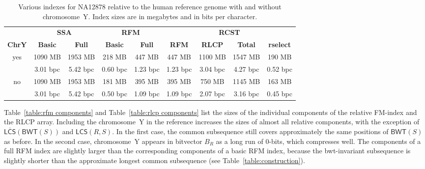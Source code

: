 \documentclass[a4paper,11pt]{llncs}
\renewcommand{\complement}[1]{\ensuremath{\overline{ #1 }}}
\newcommand{\RCST}{\textsf{RCST}}
\newcommand{\SSA}{\textsf{SSA}}
\newcommand{\RFM}{\textsf{RFM}}
\newcommand{\mBWT}{\ensuremath{\mathsf{BWT}}}
\newcommand{\RLCP}{\textsf{RLCP}}
\newcommand{\mLCS}{\ensuremath{\mathsf{LCS}}}
\newcommand{\mCS}{\ensuremath{\complement{\mathsf{LCS}}}}
\newcommand{\rselect}{\textsf{rselect}}
\newcommand{\zerobit}{$0$\nobreakdash-bit}
\begin{document}
\begin{table}
\caption{Various indexes for NA12878 relative to the human reference genome with and without chromosome~Y. Index sizes are in megabytes and in bits per character.}\label{table:indexes}
\setlength{\extrarowheight}{2pt}
\setlength{\tabcolsep}{3pt}
\begin{center}
\begin{tabular}{c|cc|cc|cccc}
\hline
 &
\multicolumn{2}{c|}{\textbf{\SSA}} &
\multicolumn{2}{c|}{\textbf{\RFM}} &
\multicolumn{4}{c}{\textbf{\RCST}} \\
\textbf{ChrY} &
\textbf{Basic} & \textbf{Full} &
\textbf{Basic} & \textbf{Full} &
\textbf{\RFM} & \textbf{\RLCP} & \textbf{Total} & \textbf{\rselect} \\
\hline
\multirow{2}{*}{yes} &  1090 MB &  1953 MB &   218 MB &   447 MB &   447 MB &  1100 MB &  1547 MB &   190 MB \\
                     & 3.01 bpc & 5.42 bpc & 0.60 bpc & 1.23 bpc & 1.23 bpc & 3.04 bpc & 4.27 bpc & 0.52 bpc \\
\hline
\multirow{2}{*}{no}  &  1090 MB &  1953 MB &   181 MB &   395 MB &   395 MB &   750 MB &  1145 MB &   163 MB \\
                     & 3.01 bpc & 5.42 bpc & 0.50 bpc & 1.09 bpc & 1.09 bpc & 2.07 bpc & 3.16 bpc & 0.45 bpc \\
\hline
\end{tabular}
\end{center}
\end{table}

Table~\ref{table:rfm components} and Table~\ref{table:rlcp components} list the sizes of the individual components of the relative FM-index and the \RLCP{} array. Including the chromosome~Y in the reference increases the sizes of almost all relative components, with the exception of $\mCS(\mBWT(S))$ and $\mLCS(R,S)$. In the first case, the common subsequence still covers approximately the same positions of $\mBWT(S)$ as before. In the second case, chromosome~Y appears in bitvector $B_{R}$ as a long run of \zerobit{}s, which compresses well. The components of a full \RFM{} index are slightly larger than the corresponding components of a basic \RFM{} index, because the bwt-invariant subsequence is slightly shorter than the approximate longest common subsequence (see Table~\ref{table:construction}).
\end{document}
